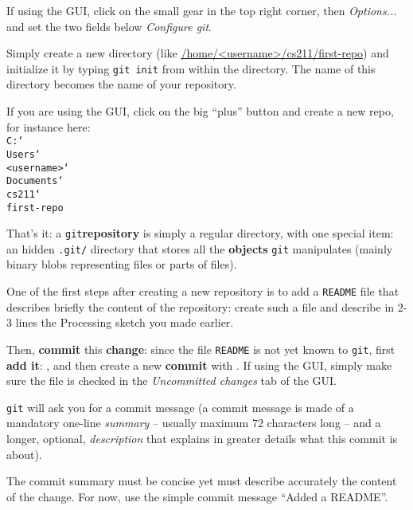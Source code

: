 \documentclass{instructions}
\newcommand{\git}{\texttt{git}\xspace}
\newcommand\bs{\char`\\}
\begin{document}
If using the GUI, click on the small gear in the top right corner, then
\emph{Options...} and set the two fields below \emph{Configure git}.


Simply create a new directory (like \url{/home/<username>/cs211/first-repo}) and initialize
it by typing \texttt{git init} from within the directory. The name of this
directory becomes the name of your repository.

If you are using the GUI, click on the big ``plus'' button and create a new repo,
for instance here:\\ \texttt{C:\bs{}Users\bs{}<username>\bs{}Documents\bs{}cs211\bs{}first-repo}

That's it: a \git \textbf{repository} is simply a regular directory, with one
special item: an hidden \texttt{.git/} directory that stores all the
\textbf{objects} \git manipulates (mainly binary blobs representing files or
parts of files).


One of the first steps after creating a new repository is to add a
\texttt{README} file that describes briefly the content of the repository:
create such a file and describe in 2-3 lines the Processing sketch you made
earlier.


Then, \textbf{commit} this \textbf{change}: since the file \texttt{README} is
not yet known to \git, first \textbf{add it}: , and
then create a new \textbf{commit} with . If using the GUI, simply
make sure the file is checked in the \emph{Uncommitted changes} tab of the GUI.

\git will ask you for a
commit message (a commit message is made of a mandatory one-line \emph{summary} --
usually maximum 72 characters long -- and a longer, optional, \emph{description} that explains
in greater details what this commit is about).

The commit summary must be concise yet must describe accurately the content of
the change. For now, use the simple commit message ``Added a README''.
\end{document}
